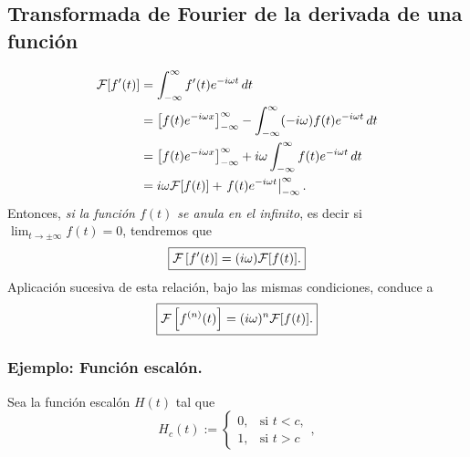 \subsection{Transformada de Fourier de la derivada de una función}
\begin{align}
{\cal F}[f'(t)]
 &=\int_{-\infty}^\infty f'(t) e^{-i\omega t}\,dt \\
 &=\left[ f(t) e^{-i\omega x}\right]_{-\infty}^\infty
 -\int_{-\infty}^\infty (-i\omega) f(t) e^{-i\omega t}\,dt \\
 &=\left[ f(t) e^{-i\omega x}\right]_{-\infty}^\infty+ i\omega\int_{-\infty}^\infty f(t) e^{-i\omega t}\,dt \\
 &= i\omega{\cal F}[f(t)]+\left. f(t) e^{-i\omega t}\right|_{-\infty}^\infty.\label{eq:trans-fourier-derivada-gen}
\end{align}
Entonces, \textit{si la función $f(t)$ se anula en el infinito}, es decir si $\lim_{t\to\pm\infty}f(t)=0$, tendremos que
\begin{equation}
\boxed{ 
{\cal F}\left[f'(t)\right] = (i\omega){\cal F}[f(t)]. \label{eq:trans-fourier-derivada-esp}
 } 
\end{equation} 
Aplicación sucesiva de esta relación, bajo las mismas condiciones, conduce a
\begin{equation}
\boxed{ 
{\cal F}\left[f^{(n)}(t)\right] = (i\omega)^n{\cal F}[f(t)]. 
 } 
\end{equation} 



\subsubsection{Ejemplo: Función escalón.}
Sea la función escalón $H(t)$ tal que
\begin{equation}
H_c(t) := 
\begin{cases}
0, &\text{si }t < c,\\
1, &\text{si }t > c
\end{cases},
\end{equation}

